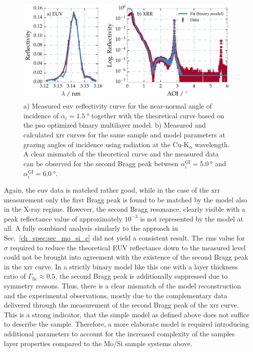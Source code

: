 \begin{figure}[htbp]
  \centering
  \includegraphics[width=\textwidth]{img/CrSc_binary_model_EUV_vs_XRR}
  \caption{a) Measured \gls{euv} reflectivity curve for the near-normal angle of incidence of $\alpha_i=\SI{1.5}{\degree}$ together with the theoretical curve based on the \gls{pso} optimized binary multilayer model. b) Measured and calculated \gls{xrr} curves for the same sample and model parameters at grazing angles of incidence using radiation at the Cu-K$_\alpha$ wavelength. A clear mismatch of the theoretical curve and the measured data can be observed for the second Bragg peak between $\alpha_i^\text{GI} = \SI{5.0}{\degree}$ and $\alpha_i^\text{GI} = \SI{6.0}{\degree}$.}
  \label{ch_spec:fig_CrSc_binary_model_EUV_vs_XRR}
\end{figure}

Again, the \gls{euv} data is matched rather good, while in the case of the \gls{xrr} measurement only the first Bragg peak is found to be matched by the model also in the X-ray regime. However, the second Bragg resonance, clearly visible with a peak reflectance value of approximately $10^{-3}$ is not represented by the model at all. A fully
combined analysis similarly to the approach in Sec.~\ref{ch_spec:sec_mo_si_c} did not yield a consistent result. The \gls{rms} value for $\sigma$ required to reduce the theoretical EUV reflectance down to the measured 
level could not be brought into agreement with the existence of the second Bragg peak in the \gls{xrr} curve. In a strictly binary model like this one with a layer thickness ratio of 
$\Gamma_\text{Sc}\approx 0.5$, the second Bragg peak is additionally suppressed 
due to symmetry reasons. Thus, there is a clear mismatch of the model reconstruction and the experimental observations, mostly due to the complementary data delivered through the measurement of the second Bragg peak of the \gls{xrr} curve. This is a strong indicator, that the simple model as defined above does not suffice to describe the sample. Therefore, a more elaborate model is required introducing additional parameters to account for the increased complexity of the samples layer properties compared to the Mo/Si sample systems above.

